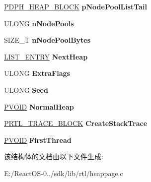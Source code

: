 \begin{DoxyCompactItemize}
\hyperlink{struct___d_p_h___h_e_a_p___b_l_o_c_k}{P\+D\+P\+H\+\_\+\+H\+E\+A\+P\+\_\+\+B\+L\+O\+CK} {\bfseries p\+Node\+Pool\+List\+Tail}
\item 
\mbox{\label{struct___d_p_h___h_e_a_p___r_o_o_t_a525dd943baf2d62fb59fef1787da90df}} 
U\+L\+O\+NG {\bfseries n\+Node\+Pools}
\item 
\mbox{\label{struct___d_p_h___h_e_a_p___r_o_o_t_a13bd1254a0dd160a093f8d76c984cb14}} 
S\+I\+Z\+E\+\_\+T {\bfseries n\+Node\+Pool\+Bytes}
\item 
\mbox{\label{struct___d_p_h___h_e_a_p___r_o_o_t_a5b8fb8ec48c299d226d449532ab8f3c7}} 
\hyperlink{struct___l_i_s_t___e_n_t_r_y}{L\+I\+S\+T\+\_\+\+E\+N\+T\+RY} {\bfseries Next\+Heap}
\item 
\mbox{\label{struct___d_p_h___h_e_a_p___r_o_o_t_a641434e42e28d5a5bd776f120c1206be}} 
U\+L\+O\+NG {\bfseries Extra\+Flags}
\item 
\mbox{\label{struct___d_p_h___h_e_a_p___r_o_o_t_a4a9b18c212019368f166161294a41f0b}} 
U\+L\+O\+NG {\bfseries Seed}
\item 
\mbox{\label{struct___d_p_h___h_e_a_p___r_o_o_t_acb2a32e846ca9666276458b22c6eeae0}} 
\hyperlink{interfacevoid}{P\+V\+O\+ID} {\bfseries Normal\+Heap}
\item 
\mbox{\label{struct___d_p_h___h_e_a_p___r_o_o_t_aa909f55db73015ee27f6cb0ecdf35ca4}} 
\hyperlink{struct___r_t_l___t_r_a_c_e___b_l_o_c_k}{P\+R\+T\+L\+\_\+\+T\+R\+A\+C\+E\+\_\+\+B\+L\+O\+CK} {\bfseries Create\+Stack\+Trace}
\item 
\mbox{\label{struct___d_p_h___h_e_a_p___r_o_o_t_a28c2c47acfc333cbe98bde5fe72bfa6c}} 
\hyperlink{interfacevoid}{P\+V\+O\+ID} {\bfseries First\+Thread}
\end{DoxyCompactItemize}


该结构体的文档由以下文件生成\+:\begin{DoxyCompactItemize}
\item 
E\+:/\+React\+O\+S-\/0../sdk/lib/rtl/heappage.\+c\end{DoxyCompactItemize}

